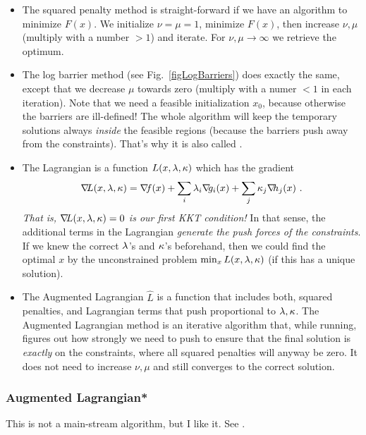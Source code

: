 \begin{itemize}
\item The squared penalty method is straight-forward if we have an
algorithm to minimize $F(x)$. We initialize $\nu=\mu=1$, minimize
$F(x)$, then increase $\nu,\mu$ (multiply with a number $>1$) and
iterate. For $\nu,\mu\to\infty$ we retrieve the optimum.

\item The log barrier method (see Fig.~\ref{figLogBarriers}) does
exactly the same, except that we decrease $\mu$ towards zero (multiply
with a numer $<1$ in each iteration). Note that we need a
feasible initialization $x_0$, because otherwise the barriers are
ill-defined! The whole algorithm will keep the temporary solutions
always \emph{inside} the feasible regions (because the barriers push
away from the constraints). That's why it is also
called .

\item The Lagrangian is a function $L(x,\lambda,\kappa)$ which has the gradient
\begin{equation}
\na L(x,\l,\k) = \na f(x) + \sum_i \l_i \na g_i(x) + \sum_j \k_j \na
h_j(x) ~.
\end{equation}
\emph{That is, ${\nabla_{\!\!}} L(x,\lambda,\kappa)=0$ is our first KKT condition!} In that
sense, the additional terms in the Lagrangian \emph{generate the push
forces of the constraints}. If we knew the correct $\lambda$'s and $\kappa$'s
beforehand, then we could find the optimal $x$ by the
unconstrained problem $\min_x L(x,\lambda,\kappa)$ (if this has a unique solution).

\item The Augmented Lagrangian $\hat L$ is a function that includes
 both, squared penalties, and Lagrangian terms that push proportional
 to $\lambda,\kappa$. The Augmented Lagrangian method is an
 iterative algorithm that, while running, figures out how strongly we
 need to push to ensure that the final solution is \emph{exactly} on
 the constraints, where all squared penalties will anyway be zero. It
 does not need to increase $\nu,\mu$ and still converges to the correct
 solution.
\end{itemize}



\subsubsection{Augmented Lagrangian*}

This is not a main-stream algorithm, but I like
it. See \cite{14-toussaint-AugLag}.

